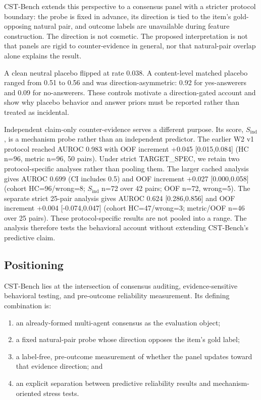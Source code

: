 \documentclass[11pt]{article}
\begin{document}
CST-Bench extends this perspective to a consensus panel with a stricter protocol boundary: the probe is fixed in advance, its direction is tied to the item's gold-opposing natural pair, and outcome labels are unavailable during feature construction. The direction is not cosmetic. The proposed interpretation is not that panels are rigid to counter-evidence in general, nor that natural-pair overlap alone explains the result.

A clean neutral placebo flipped at rate 0.038. A content-level matched placebo ranged from 0.51 to 0.56 and was direction-asymmetric: 0.92 for yes-answerers and 0.09 for no-answerers. These controls motivate a direction-gated account and show why placebo behavior and answer priors must be reported rather than treated as incidental.

Independent claim-only counter-evidence serves a different purpose. Its score, \(S_{\text{ind}}\), is a mechanism probe rather than an independent predictor. The earlier W2 v1 protocol reached AUROC 0.983 with OOF increment +0.045 [0.015,0.084] (HC n=96, metric n=96, 50 pairs). Under strict TARGET\_\allowbreak{}SPEC, we retain two protocol-specific analyses rather than pooling them. The larger cached analysis gives AUROC 0.699 (CI includes 0.5) and OOF increment +0.027 [0.000,0.058] (cohort HC=96/wrong=8; \(S_{\text{ind}}\) n=72 over 42 pairs; OOF n=72, wrong=5). The separate strict 25-pair analysis gives AUROC 0.624 [0.286,0.856] and OOF increment +0.004 [-0.074,0.047] (cohort HC=47/wrong=3; metric/OOF n=46 over 25 pairs). These protocol-specific results are not pooled into a range. The analysis therefore tests the behavioral account without extending CST-Bench's predictive claim.

\subsection{Positioning}

CST-Bench lies at the intersection of consensus auditing, evidence-sensitive behavioral testing, and pre-outcome reliability measurement. Its defining combination is:

\begin{enumerate}
  \item an already-formed multi-agent consensus as the evaluation object;
  \item a fixed natural-pair probe whose direction opposes the item's gold label;
  \item a label-free, pre-outcome measurement of whether the panel updates toward that evidence direction; and
  \item an explicit separation between predictive reliability results and mechanism-oriented stress tests.
\end{enumerate}
\end{document}
